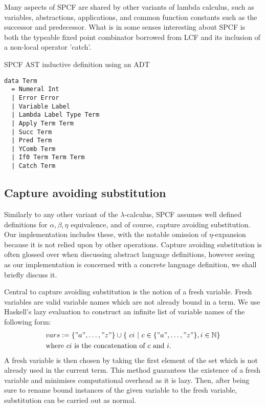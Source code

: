 \documentclass[12pt,a4paper]{report}
\theoremstyle{definition}
\theoremstyle{remark}
\begin{document}
Many aspects of SPCF are shared by other variants of lambda calculus, such as variables, abstractions, applications, and common function constants such as the successor and predecessor. What is in some senses interesting about SPCF is both the typeable fixed point combinator borrowed from LCF and its inclusion of a non-local operator 'catch'. 

\begin{listing}
\caption{SPCF AST inductive definition using an ADT}
\begin{verbatim}
data Term
  = Numeral Int
  | Error Error
  | Variable Label
  | Lambda Label Type Term
  | Apply Term Term 
  | Succ Term
  | Pred Term
  | YComb Term
  | If0 Term Term Term
  | Catch Term
\end{verbatim}
\label{listing:spcf-ast}
\end{listing}

\subsection{Capture avoiding substitution}
Similarly to any other variant of the $\lambda$-calculus, SPCF assumes well defined definitions for $\alpha, \beta, \eta$ equivalence, and of course, capture avoiding substitution. Our implementation includes these, with the notable omission of $\eta$-expansion because it is not relied upon by other operations. Capture avoiding substitution is often glossed over when discussing abstract language definitions, however seeing as our implementation is concerned with a concrete language definition, we shall briefly discuss it.

Central to capture avoiding substitution is the notion of a fresh variable. Fresh variables are valid variable names which are not already bound in a term. We use Haskell's lazy evaluation to construct an infinite list of variable names of the following form: 
\[
\begin{split}
&vars := \{"a", \dots, "z"\} \cup \{\ ci\ |\ c \in \{"a", \dots, "z"\}, i \in \mathbb{N}\} \\
&\text{where $ci$ is the concatenation of $c$ and $i$.}
\end{split}
\]
A fresh variable is then chosen by taking the first element of the set which is not already used in the current term. This method guarantees the existence of a fresh variable and minimises computational overhead as it is lazy. Then, after being sure to rename bound instances of the given variable to the fresh variable, substitution can be carried out as normal.
\end{document}
